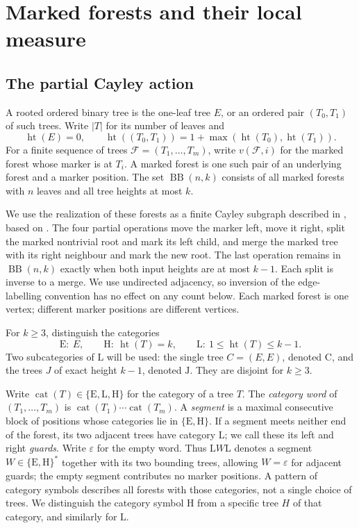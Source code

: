 \documentclass[11pt,a4paper]{article}
\theoremstyle{definition}
\theoremstyle{remark}
\newcommand{\htree}{\operatorname{ht}}
\newcommand{\BB}{\operatorname{BB}}
\newcommand{\E}{\mathrm E}
\newcommand{\HH}{\mathrm H}
\newcommand{\LL}{\mathrm L}
\newcommand{\CC}{\mathrm C}
\newcommand{\JJ}{\mathrm J}
\DeclareMathOperator{\cat}{cat}
\begin{document}
\section{Marked forests and their local measure}\label{sec:BB}
\subsection{The partial Cayley action}
A rooted ordered binary tree is the one-leaf tree $E$, or an ordered pair $(T_0,T_1)$ of such trees. Write $|T|$ for its number of leaves and
\[
\htree(E)=0,\qquad \htree((T_0,T_1))=1+\max(\htree(T_0),\htree(T_1)).
\]
For a finite sequence of trees $\mathcal F=(T_1,\ldots,T_m)$, write $v(\mathcal F,i)$ for the marked forest whose marker is at $T_i$. A marked forest is one such pair of an underlying forest and a marker position. The set $\BB(n,k)$ consists of all marked forests with $n$ leaves and all tree heights at most $k$.

We use the realization of these forests as a finite Cayley subgraph described in \cite[Sections 2 and 4]{GubaDensity}, based on \cite{BB}. The four partial operations move the marker left, move it right, split the marked nontrivial root and mark its left child, and merge the marked tree with its right neighbour and mark the new root. The last operation remains in $\BB(n,k)$ exactly when both input heights are at most $k-1$. Each split is inverse to a merge. We use undirected adjacency, so inversion of the edge-labelling convention has no effect on any count below. Each marked forest is one vertex; different marker positions are different vertices.

For $k\ge3$, distinguish the categories
\[
\E:\ E,\qquad
\HH:\ \htree(T)=k,\qquad
\LL:\ 1\le\htree(T)\le k-1.
\]
Two subcategories of $\LL$ will be used: the single tree $C=(E,E)$, denoted $\CC$, and the trees $J$ of exact height $k-1$, denoted $\JJ$. They are disjoint for $k\ge3$.

Write $\cat(T)\in\{\E,\LL,\HH\}$ for the category of a tree $T$. The \emph{category word} of $(T_1,\ldots,T_m)$ is $\cat(T_1)\cdots\cat(T_m)$. A \emph{segment} is a maximal consecutive block of positions whose categories lie in $\{\E,\HH\}$. If a segment meets neither end of the forest, its two adjacent trees have category $\LL$; we call these its left and right \emph{guards}. Write $\varepsilon$ for the empty word. Thus $\LL W\LL$ denotes a segment $W\in\{\E,\HH\}^*$ together with its two bounding trees, allowing $W=\varepsilon$ for adjacent guards; the empty segment contributes no marker positions. A pattern of category symbols describes all forests with those categories, not a single choice of trees. We distinguish the category symbol $\HH$ from a specific tree $H$ of that category, and similarly for $\LL$.
\end{document}
